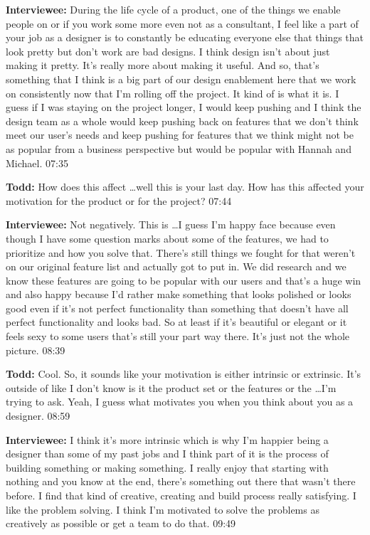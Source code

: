 \textbf{Interviewee:} During the life cycle of a product, one of the things we enable people on or if you work some more even not as a consultant, I feel like a part of your job as a designer is to constantly be educating everyone else that things that look pretty but don't work are bad designs.  I think design isn't about just making it pretty.  It's really more about making it useful.  And so, that's something that I think is a big part of our design enablement here that we work on consistently now that I'm rolling off the project.  It kind of is what it is.  I guess if I was staying on the project longer, I would keep pushing and I think the design team as a whole would keep pushing back on features that we don't think meet our user's needs and keep pushing for features that we think might not be as popular from a business perspective but would be popular with Hannah and Michael.  07:35

\textbf{Todd:} How does this affect \ldots well this is your last day.  How has this affected your motivation for the product or for the project?  07:44

\textbf{Interviewee:} Not negatively.  This is \ldots I guess I'm happy face because even though I have some question marks about some of the features, we had to prioritize and how you solve that.  There's still things we fought for that weren't on our original feature list and actually got to put in.  We did research and we know these features are going to be popular with our users and that's a huge win and also happy because I'd rather make something that looks polished or looks good even if it's not perfect functionality than something that doesn't have all perfect functionality and looks bad.  So at least if it's beautiful or elegant or it feels sexy to some users that's still your part way there.  It's just not the whole picture.  08:39

\textbf{Todd:} Cool.  So, it sounds like your motivation is either intrinsic or extrinsic.  It's outside of like I don't know is it the product set or the features or the \ldots I'm trying to ask.  Yeah, I guess what motivates you when you think about you as a designer.  08:59

\textbf{Interviewee:} I think it's more intrinsic which is why I'm happier being a designer than some of my past jobs and I think part of it is the process of building something or making something.  I really enjoy that starting with nothing and you know at the end, there's something out there that wasn't there before.  I find that kind of creative, creating and build process really satisfying.  I like the problem solving.  I think I'm motivated to solve the problems as creatively as possible or get a team to do that.  09:49

